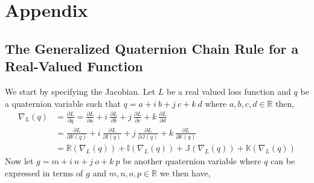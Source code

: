 \documentclass[14pt,a4paper]{article}
\begin{document}
\clearpage
{}


\clearpage
\section{Appendix}
\subsection{The Generalized Quaternion Chain Rule for a Real-Valued Function}\label{a:diff}
We start by specifying the Jacobian.
Let $L$ be a real valued loss function and $q$ be a quaternion variable such that $q = a+\textit{i}~b+\textit{j}~c+\textit{k}~d$ where $a,b,c,d \in \mathbb{R}$ then,
\begin{align}
\nabla_L(q) &= \frac{\partial L}{\partial q} = \frac{\partial L}{\partial a} + \textit{i}~\frac{\partial L}{\partial b} + \textit{j}~\frac{\partial L}{\partial c} + \textit{k}~\frac{\partial L}{\partial d} \\ \nonumber
&= \frac{\partial L}{\partial \mathbb{R}(q)} + \textit{i}~\frac{\partial L}{\partial \mathbb{I}(q)} + \textit{j}~\frac{\partial L}{\partial \mathbb{J}(q)} + \textit{k}~\frac{\partial L}{\partial \mathbb{K}(q)} \\ \nonumber
&= \mathbb{R}(\nabla_L(q)) + \mathbb{I}(\nabla_L(q)) + \mathbb{J}(\nabla_L(q)) + \mathbb{K}(\nabla_L(q)) 
\label{eq:diff1}
\end{align}
Now let $g = m+\textit{i}~n+\textit{j}~o+\textit{k}~p$ be another quaternion variable where $q$ can be expressed in terms of $g$ and $m,n,o,p \in \mathbb{R}$ we then have,
\end{document}
